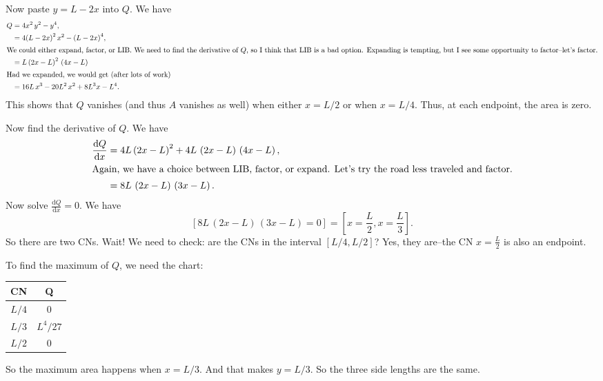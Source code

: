 \documentclass[12pt,fleqn,answers]{exam}
\begin{document}
\begin{questions}
\begin{solution}
   \quad Now paste $y = L - 2 x$ into $Q$. We have
   \begin{align*}
      Q  &=4 {{x}^{2}}\, {{y}^{2}}-{{y}^{4}},\\
          &= 4 {{\left( L-2 x\right) }^{2}}\, {{x}^{2}}-{{\left( L-2 x\right) }^{4}}, \\
          \intertext{We could either expand, factor, or LIB. We need to find the
          derivative of $Q$, so I think that LIB is a bad option.
          Expanding is tempting, but I see some opportunity to factor--let's factor.}
          &= L\, {{\left( 2 x-L\right) }^{2}}\, \left( 4 x-L\right) \\
          \intertext{Had we expanded, we would get (after lots of work)}
          &= 16 L\, {{x}^{3}}-20 {{L}^{2}}\, {{x}^{2}}+8 {{L}^{3}} x-{{L}^{4}}.
   \end{align*}
   This shows that $Q$ vanishes (and thus $A$ vanishes as well) when
   either $x = L/2$ or when $x = L/4$. Thus, at each endpoint, the
   area is zero.

  \quad Now find the derivative of $Q$. We have
    \begin{align*}
      \frac{\mathrm{d} Q}{\mathrm{d} x}   &= 4 L\, {{\left( 2 x-L\right) }^{2}}+4 L\, \left( 2 x-L\right) \, \left( 4 x-L\right) ,\\
      \intertext{Again, we have a choice between LIB, factor, or expand. 
      Let's try the road less traveled and factor.}
                                                              &= 8 L\, \left( 2 x-L\right) \, \left( 3 x-L\right).
   \end{align*}   
   Now solve $\displaystyle \frac{\mathrm{d} Q}{\mathrm{d} x} = 0$. We have
   \begin{equation}
   \left[ 8 L\, \left( 2 x-L\right) \, \left( 3 x-L\right) = 0 \right] = \left[ x = \frac{L}{2}, x = \frac{L}{3} \right].
   \end{equation}
   So there are two CNs. Wait! We need to check: are the CNs in 
   the interval $[L/4, L/2]$? Yes, they are--the CN  $x = \frac{L}{2}$
   is also an endpoint.
   
   
  \quad To find the maximum of $Q$, we need the chart:
   \begin{center}
\begin{tabular}{|c|c|} \hline 
    CN & Q \\ \hline \hline
    $L/4$  & 0 \\
    $L/3$ & $L^{4}/27$ \\
    $L/2$ & 0 \\ \hline
\end{tabular}
\end{center}
So the maximum area happens when $x = L/3$. And that makes $y = L/3$.
So the three side lengths are the same.


\end{solution}
\end{questions}
\end{document}
